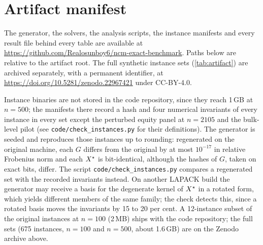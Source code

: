 \section{Artifact manifest}\label{app:artifact}

The generator, the solvers, the analysis scripts, the instance manifests and
every result file behind every table are available at
\url{https://github.com/Realosunboy6/ncm-exact-benchmark}. Paths below are
relative to the artifact root. The full synthetic instance sets
(\cref{tab:artifact}) are archived separately, with a permanent identifier, at
\url{https://doi.org/10.5281/zenodo.22967421} under CC-BY-4.0.

Instance binaries are not stored in the code repository, since they reach
1\,GB at $n=500$; the manifests there record a hash and four numerical
invariants of every instance in every set except the perturbed equity panel
at $n=2105$ and the bulk-level pilot (see \texttt{code/check\_instances.py}
for their definitions). The generator is seeded and reproduces
those instances up to rounding: regenerated on the original machine, each $G$
differs from the original by at most $10^{-17}$ in relative Frobenius norm and
each $X^\star$ is bit-identical, although the hashes of $G$, taken on exact bits,
differ.
The script \texttt{code/check\_instances.py} compares a regenerated set with
the recorded invariants instead. On another LAPACK build the generator may
receive a basis for the degenerate kernel of $X^\star$ in a rotated form, which
yields different members of the same family; the check detects this, since a
rotated basis moves the invariants by 15 to 20 per cent. A 12-instance subset
of the original instances at $n=100$ (2\,MB) ships with the code repository;
the full sets (675 instances, $n=100$ and $n=500$, about 1.6\,GB) are on the
Zenodo archive above.

